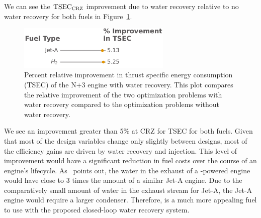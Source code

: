 \documentclass[conf]{new-aiaa}
\begin{document}
We can see the $\rm{TSEC}_{\rm{CRZ}}$ improvement due to water recovery relative to no water recovery for both fuels in Figure~\ref{fig:barchart}.

\begin{figure}[hbt!]
    \centering
    \includegraphics[width=0.65\textwidth]{bar_chart.pdf}
    \caption{Percent relative improvement in thrust specific energy consumption (TSEC) of the N+3 engine with water recovery.
        This plot compares the relative improvement of the two optimization problems with water recovery compared to the optimization problems without water recovery.}
    \label{fig:barchart}
\end{figure}

We see an improvement greater than 5\% at CRZ for TSEC for both fuels.
Given that most of the design variables change only slightly between designs, most of the efficiency gains are driven by water recovery and injection.
This level of improvement would have a significant reduction in fuel costs over the course of an engine's lifecycle.
As~\citeauthor{Strom2002} points out, the water in the exhaust of a -powered engine would have close to 3 times the amount of a similar Jet-A engine.
Due to the comparatively small amount of water in the exhaust stream for Jet-A, the Jet-A engine would require a larger condenser.
Therefore,  is a much more appealing fuel to use with the proposed closed-loop water recovery system.
\end{document}
